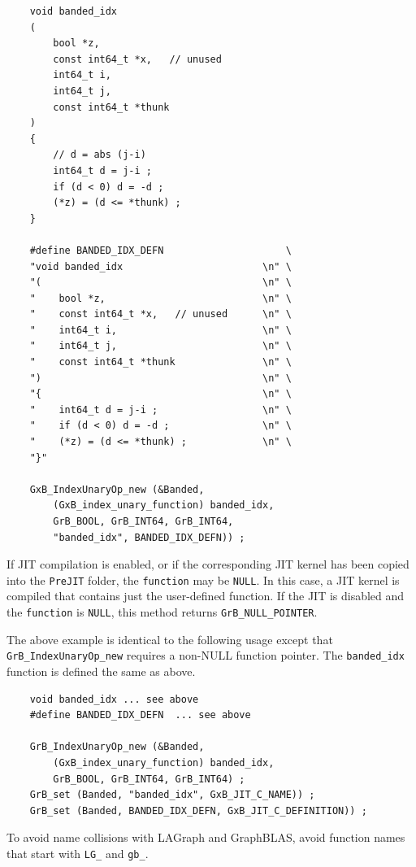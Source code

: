 {\footnotesize
\begin{verbatim}
    void banded_idx
    (
        bool *z,
        const int64_t *x,   // unused
        int64_t i,
        int64_t j,
        const int64_t *thunk
    )
    {
        // d = abs (j-i)
        int64_t d = j-i ;
        if (d < 0) d = -d ;
        (*z) = (d <= *thunk) ;
    }

    #define BANDED_IDX_DEFN                     \
    "void banded_idx                        \n" \
    "(                                      \n" \
    "    bool *z,                           \n" \
    "    const int64_t *x,   // unused      \n" \
    "    int64_t i,                         \n" \
    "    int64_t j,                         \n" \
    "    const int64_t *thunk               \n" \
    ")                                      \n" \
    "{                                      \n" \
    "    int64_t d = j-i ;                  \n" \
    "    if (d < 0) d = -d ;                \n" \
    "    (*z) = (d <= *thunk) ;             \n" \
    "}"

    GxB_IndexUnaryOp_new (&Banded,
        (GxB_index_unary_function) banded_idx,
        GrB_BOOL, GrB_INT64, GrB_INT64,
        "banded_idx", BANDED_IDX_DEFN)) ;\end{verbatim}}

If JIT compilation is enabled, or if the corresponding JIT kernel has been
copied into the \verb'PreJIT' folder, the \verb'function' may be \verb'NULL'.
In this case, a JIT kernel is compiled that contains just the user-defined
function.  If the JIT is disabled and the \verb'function' is \verb'NULL', this
method returns \verb'GrB_NULL_POINTER'.

The above example is identical to the following usage
except that \verb'GrB_IndexUnaryOp_new' requires a non-NULL function pointer.
The \verb'banded_idx' function is defined the same as above.

{\footnotesize
\begin{verbatim}
    void banded_idx ... see above
    #define BANDED_IDX_DEFN  ... see above

    GrB_IndexUnaryOp_new (&Banded,
        (GxB_index_unary_function) banded_idx,
        GrB_BOOL, GrB_INT64, GrB_INT64) ;
    GrB_set (Banded, "banded_idx", GxB_JIT_C_NAME)) ;
    GrB_set (Banded, BANDED_IDX_DEFN, GxB_JIT_C_DEFINITION)) ;\end{verbatim}}

To avoid name collisions with LAGraph and GraphBLAS, avoid
function names that start with \verb'LG_' and \verb'gb_'.

